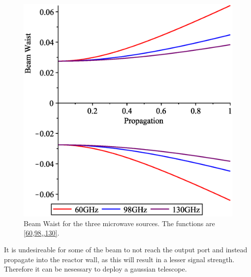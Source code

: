 \begin{figure}
	\centering
	\includegraphics[width=.5\textwidth]{Figures/BeamProp.eps}
	\caption{Beam Waist for the three microwave sources. The functions are \cref{60,98,,130}.}
	\label{BeamProp}
\end{figure}
It is undesireable for some of the beam to not reach the output port and instead propagate into the reactor wall, as this will result in a lesser signal strength. Therefore it can be nesessary to deploy a gaussian telescope.
